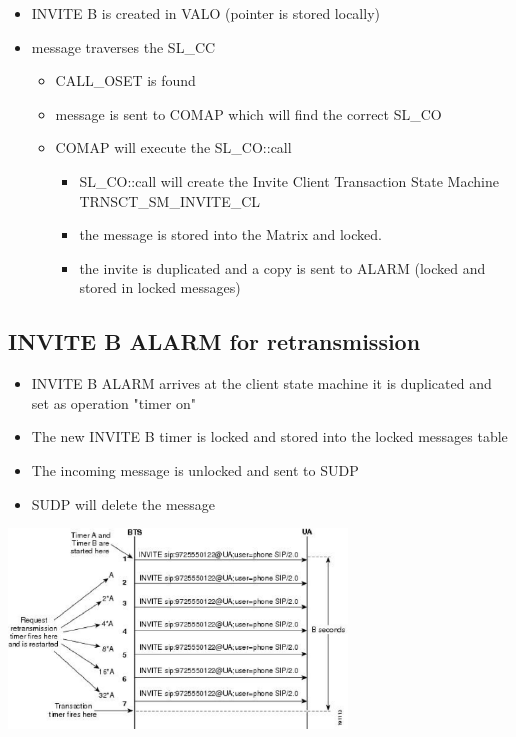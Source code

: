 \documentclass[a4paper]{article}
\begin{document}
\begin {itemize}
\item INVITE B is created in VALO (pointer is stored locally)
\item message traverses the SL\_CC
\begin {itemize}
\item CALL\_OSET is found
\item message is sent to COMAP which will find the correct SL\_CO
\item COMAP will execute the SL\_CO::call
\begin {itemize}
\item SL\_CO::call will create the Invite Client Transaction State Machine TRNSCT\_SM\_INVITE\_CL
\item the message is stored into the Matrix and locked.
\item the invite is duplicated and a copy is sent to ALARM (locked and stored in locked messages)
\end{itemize}
\end{itemize}
\end{itemize}

\subsection{INVITE B ALARM for retransmission}

\begin {itemize}
\item INVITE B ALARM arrives at the client state machine it is duplicated and set as operation "timer on"
\item The new INVITE B timer is locked and stored into the locked messages table
\item The incoming message is unlocked and sent to SUDP
\item SUDP will delete the message
\end{itemize}

\includegraphics[width=90mm]{timerAlogic.eps}
\end{document}
